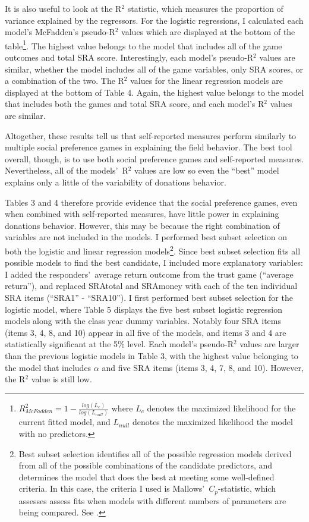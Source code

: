 \documentclass[12pt]{article}
\begin{document}
It is also useful to look at the R$^{2}$ statistic, which measures the proportion of variance explained by the regressors. For the logistic regressions, I calculated each model\rq s McFadden\rq s pseudo-R$^{2}$ values which are displayed at the bottom of the table\footnote{
\(R^{2}_{McFadden} = 1 - \frac{log(L_{c})}{log(L_{null})}\)
where \(L_{c}\) denotes the maximized likelihood for the current fitted model, and \(L_{null}\) denotes the maximized likelihood the model with no predictors.
}. The highest value belongs to the model that includes all of the game outcomes and total SRA score. Interestingly, each model\rq s pseudo-R$^{2}$ values are similar, whether the model includes all of the game variables, only SRA scores, or a combination of the two. The R$^{2}$ values for the linear regression models are displayed at the bottom of Table 4. Again, the highest value belongs to the model that includes both the games and total SRA score, and each model\rq s R$^{2}$ values are similar. 

Altogether, these results tell us that self-reported measures perform similarly to multiple social preference games in explaining the field behavior. The best tool overall, though, is to use both social preference games and self-reported measures. Nevertheless, all of the models\rq \ R$^{2}$ values are low so even the ``best'' model explains only a little of the variability of donations behavior.

Tables 3 and 4 therefore provide evidence that the social preference games, even when combined with self-reported measures, have little power in explaining donations behavior. However, this may be because the right combination of variables are not included in the models. I performed best subset selection on both the logistic and linear regression models\footnote{Best subset selection identifies all of the possible regression models derived from all of the possible combinations of the candidate predictors, and determines the model that does the best at meeting some well-defined criteria. In this case, the criteria I used is Mallows\rq \ \(C_{p}\)-statistic, which assesses assess fits when models with different numbers of parameters are being compared.  See \cite{mallows_1973}.}. Since best subset selection fits all possible models to find the best candidate, I included more explanatory variables: I added the responders\rq \ average return outcome from the trust game (``average return''), and replaced SRAtotal and SRAmoney with each of the ten individual SRA items (``SRA1'' - ``SRA10''). I first performed best subset selection for the logistic model, where Table 5 displays the five best subset logistic regression models along with the class year dummy variables. Notably four SRA items (items 3, 4, 8, and 10) appear in all five of the models, and items 3 and 4 are statistically significant at the 5\% level. Each model\rq s pseudo-R$^{2}$ values are larger than the previous logistic models in Table 3, with the highest value belonging to the model that includes \(\alpha\) and five SRA items (items 3, 4, 7, 8, and 10). However, the R$^{2}$ value is still low.
\end{document}
